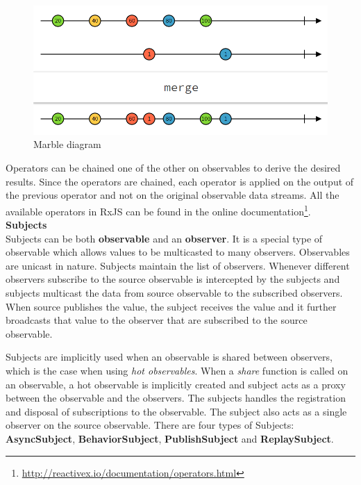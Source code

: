 \begin{figure}[!h]
	\centering
	\includegraphics[scale=0.5,trim=0 0 0 0]{images/operator-marble-diagram.png}
	\caption{Marble diagram}
	\label{fig:operator-marble-diagram}
\end{figure}

Operators can be chained one of the other on observables to derive the desired results. Since the operators are chained, each operator is applied on the output of the previous operator and not on the original observable data streams. All the available operators in RxJS can be found in the online documentation\footnote{\url{http://reactivex.io/documentation/operators.html}}.
\\
\textbf{Subjects}
\\
Subjects can be both \textbf{observable} and an \textbf{observer}\cite{reactiveSubjects}. It is a special type of observable which allows values to be multicasted to many observers. Observables are unicast in nature. Subjects maintain the list of observers. Whenever different observers subscribe to the source observable is intercepted by the subjects and subjects multicast the data from source observable to the subscribed observers. When source publishes the value, the subject receives the value and it further broadcasts that value to the observer that are subscribed to the source observable. 


Subjects are implicitly used when an observable is shared between observers, which is the case when using \textit{hot observables}. When a \textit{share} function is called on an observable, a hot observable is implicitly created and subject acts as a proxy between the observable and the observers. The subjects handles the registration and disposal of subscriptions to the observable. The subject also acts as a single observer on the source observable. There are four types of Subjects: \textbf{AsyncSubject}, \textbf{BehaviorSubject}, \textbf{PublishSubject} and \textbf{ReplaySubject}.

